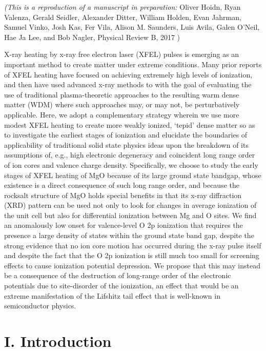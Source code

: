 \emph{(This is a reproduction of a manuscript in preparation: }
Oliver Hoidn, Ryan Valenza, Gerald Seidler, Alexander Ditter, William Holden, Evan
Jahrman, Samuel Vinko, Josh Kas, Fer Vila, Alison M.
Saunders, Luis Avila, Galen
O'Neil, Hae Ja Lee, and Bob Nagler,
Physical Review B, 2017
)



\begin{addmargin}[2.5em]{2.5em}
X-ray heating by x-ray free electron laser (XFEL) pulses is emerging as
an important method to create matter under extreme conditions. Many
prior reports of XFEL heating have focused on achieving extremely high
levels of ionization, and then have used advanced x-ray methods to with
the goal of evaluating the use of traditional plasma-theoretic
approaches to the resulting warm dense matter (WDM) where such
approaches may, or may not, be perturbatively applicable. Here, we adopt
a complementary strategy wherein we use more modest XFEL heating to
create more weakly ionized, `tepid' dense matter so as to investigate
the earliest stages of ionization and elucidate the boundaries of
applicability of traditional solid state physics ideas upon the
breakdown of its assumptions of, e.g., high electronic degeneracy and
coincident long range order of ion cores and valence charge density.
Specifically, we choose to study the early stages of XFEL heating of MgO
because of its large ground state bandgap, whose existence is a direct
consequence of such long range order, and because the rocksalt structure
of MgO holds special benefits in that its x-ray diffraction (XRD)
pattern can be used not only to look for changes in average ionization
of the unit cell but also for differential ionization between Mg and O
sites. We find an anomalously low onset for valence-level O 2p
ionization that requires the presence a large density of states within
the ground state band gap, despite the strong evidence that no ion core
motion has occurred during the x-ray pulse itself and despite the fact
that the O 2p ionization is still much too small for screening effects
to cause ionization potential depression. We propose that this may
instead be a consequence of the destruction of long-range order of the
electronic potentials due to site-disorder of the ionization, an effect
that would be an extreme manifestation of the Lifshitz tail effect that
is well-known in semiconductor physics.
\end{addmargin}



\section{I. Introduction}

